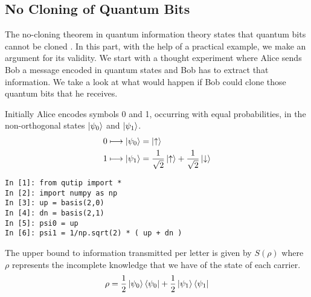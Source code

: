 \subsection{No Cloning of Quantum Bits}
The no-cloning theorem in quantum information theory states that quantum bits cannot be cloned \cite{nielsenchuang}. In this part, with the help of a practical example, we make an argument for its validity. We start with a thought experiment where Alice sends Bob a message encoded in quantum states and Bob has to extract that information. We take a look at what would happen if Bob could clone those quantum bits that he receives.
\par Initially Alice encodes symbols 0 and 1, occurring with equal probabilities, in the non-orthogonal states $\ket{\psi_0}$ and $\ket{\psi_1}$.
\begin{align*}
0 \longmapsto \ket{\psi_0} &= \ket{\uparrow} \\
1 \longmapsto \ket{\psi_1} &= \frac{1}{\sqrt{2}} \ket{\uparrow} + \frac{1}{\sqrt{2}} \ket{\downarrow}
\end{align*}

\begin{verbatim}
In [1]: from qutip import *
In [2]: import numpy as np
In [3]: up = basis(2,0)
In [4]: dn = basis(2,1)
In [5]: psi0 = up
In [6]: psi1 = 1/np.sqrt(2) * ( up + dn )
\end{verbatim}

The upper bound to information transmitted per letter is given by $S(\rho)$ where $\rho$ represents the incomplete knowledge that we have of the state of each carrier.
\begin{align*}
\rho = \frac{1}{2} \ket{\psi_0} \bra{\psi_0} + \frac{1}{2} \ket{\psi_1} \bra{\psi_1}
\end{align*}

